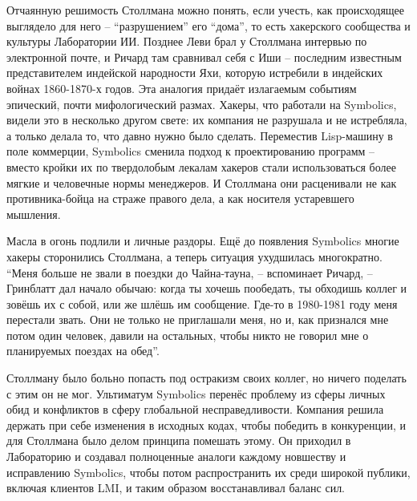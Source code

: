 Отчаянную решимость Столлмана можно понять, если учесть, как происходящее выглядело для него -- \enquote{разрушением} его \enquote{дома}, то есть хакерского сообщества и культуры Лаборатории ИИ. Позднее Леви брал у Столлмана интервью по электронной почте, и Ричард там сравнивал себя с Иши -- последним известным представителем индейской народности Яхи, которую истребили в индейских войнах 1860-1870-х годов. Эта аналогия придаёт излагаемым событиям эпический, почти мифологический размах.  Хакеры, что работали на Symbolics, видели это в несколько другом свете: их компания не разрушала и не истребляла, а только делала то, что давно нужно было сделать. Переместив Lisp-машину в поле коммерции, Symbolics сменила подход к проектированию программ -- вместо кройки их по твердолобым лекалам хакеров стали использоваться более мягкие и человечные нормы менеджеров. И Столлмана они расценивали не как противника-бойца на страже правого дела, а как носителя устаревшего мышления.

Масла в огонь подлили и личные раздоры. Ещё до появления Symbolics многие хакеры сторонились Столлмана, а теперь ситуация ухудшилась многократно. \enquote{Меня больше не звали в поездки до Чайна-тауна, -- вспоминает Ричард, -- Гринблатт дал начало обычаю: когда ты хочешь пообедать, ты обходишь коллег и зовёшь их с собой, или же шлёшь им сообщение. Где-то в 1980-1981 году меня перестали звать. Они не только не приглашали меня, но и, как признался мне потом один человек, давили на остальных, чтобы никто не говорил мне о планируемых поездах на обед}.

Столлману было больно попасть под остракизм своих коллег, но ничего поделать с этим он не мог. Ультиматум Symbolics перенёс проблему из сферы личных обид и конфликтов в сферу глобальной несправедливости. Компания решила держать при себе изменения в исходных кодах, чтобы победить в конкуренции, и для Столлмана было делом принципа помешать этому. Он приходил в Лабораторию и создавал полноценные аналоги каждому новшеству и исправлению Symbolics, чтобы потом распространить их среди широкой публики, включая клиентов LMI, и таким образом восстанавливал баланс сил.


